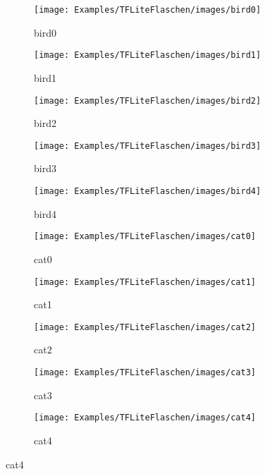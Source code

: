 \begin{figure} [H]
	\begin{subfigure}{0.19\textwidth}
    \centering
	\texttt{[image: Examples/TFLiteFlaschen/images/bird0]}
	\caption{bird0}
	\end{subfigure}
	\begin{subfigure}{0.19\textwidth}
    \centering
	\texttt{[image: Examples/TFLiteFlaschen/images/bird1]}
	\caption{bird1}
	\end{subfigure}
	\begin{subfigure}{0.19\textwidth}
    \centering
	\texttt{[image: Examples/TFLiteFlaschen/images/bird2]}
	\caption{bird2}
	\end{subfigure}
	\begin{subfigure}{0.19\textwidth}
    \centering
	\texttt{[image: Examples/TFLiteFlaschen/images/bird3]}
	\caption{bird3}
	\end{subfigure}
	\begin{subfigure}{0.19\textwidth}
    \centering
	\texttt{[image: Examples/TFLiteFlaschen/images/bird4]}
	\caption{bird4}
	\end{subfigure}
	
	    \begin{subfigure}{0.19\textwidth}
    \centering
	\texttt{[image: Examples/TFLiteFlaschen/images/cat0]}
	\caption{cat0}
	\end{subfigure}
	\begin{subfigure}{0.19\textwidth}
    \centering
	\texttt{[image: Examples/TFLiteFlaschen/images/cat1]}
	\caption{cat1}
	\end{subfigure}
	\begin{subfigure}{0.19\textwidth}
    \centering
	\texttt{[image: Examples/TFLiteFlaschen/images/cat2]}
	\caption{cat2}
	\end{subfigure}
	\begin{subfigure}{0.19\textwidth}
    \centering
	\texttt{[image: Examples/TFLiteFlaschen/images/cat3]}
	\caption{cat3}
	\end{subfigure}
	\begin{subfigure}{0.19\textwidth}
    \centering
	\texttt{[image: Examples/TFLiteFlaschen/images/cat4]}
	\caption{cat4}
	\end{subfigure}
	

\end{figure}
